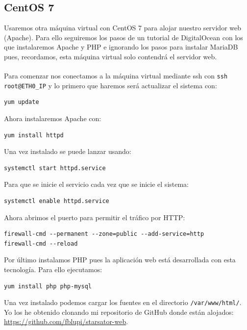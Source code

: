 \subsection{CentOS 7}

Usaremos otra máquina virtual con CentOS 7 para alojar nuestro servidor web (Apache). Para ello seguiremos los pasos de un tutorial de DigitalOcean \cite{InstallLAMPCentos7} con los que instalaremos Apache y PHP e ignorando los pasos para instalar MariaDB pues, recordamos, esta máquina virtual solo contendrá el servidor web.
\\ \\
Para comenzar nos conectamos a la máquina virtual mediante ssh con \texttt{ssh root@ETH0\_IP} y lo primero que haremos será actualizar el sistema con:

\begin{lstlisting}
yum update
\end{lstlisting}

Ahora instalaremos Apache con:

\begin{lstlisting}
yum install httpd
\end{lstlisting}

Una vez instalado se puede lanzar usando:

\begin{lstlisting}
systemctl start httpd.service
\end{lstlisting}

Para que se inicie el servicio cada vez que se inicie el sistema:

\begin{lstlisting}
systemctl enable httpd.service
\end{lstlisting}

Ahora abrimos el puerto para permitir el tráfico por HTTP:

\begin{lstlisting}
firewall-cmd --permanent --zone=public --add-service=http
firewall-cmd --reload
\end{lstlisting}

Por último instalamos PHP pues la aplicación web está desarrollada con esta tecnología. Para ello ejecutamos:

\begin{lstlisting}
yum install php php-mysql
\end{lstlisting}

Una vez instalado podemos cargar los fuentes en el directorio \texttt{/var/www/html/}. Yo los he obtenido clonando mi repositorio de GitHub donde están alojados: \url{https://github.com/fblupi/starsator-web}.

